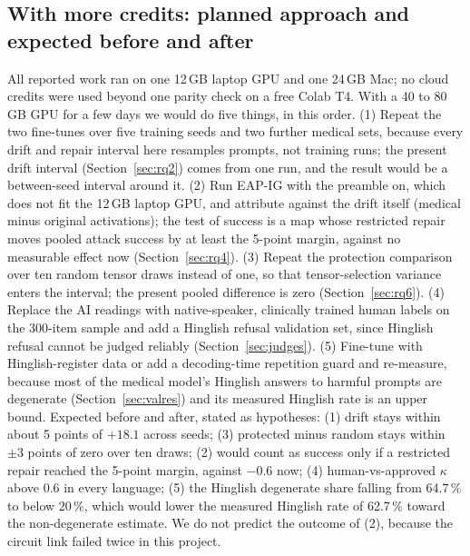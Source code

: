 \subsection{With more credits: planned approach and expected before and after}
All reported work ran on one 12\,GB laptop GPU and one 24\,GB Mac; no cloud credits were used beyond one parity check on a free Colab T4. With a 40 to 80\,GB GPU for a few days we would do five things, in this order. (1) Repeat the two fine-tunes over five training seeds and two further medical sets, because every drift and repair interval here resamples prompts, not training runs; the present drift interval (Section~\ref{sec:rq2}) comes from one run, and the result would be a between-seed interval around it. (2) Run EAP-IG with the preamble on, which does not fit the 12\,GB laptop GPU, and attribute against the drift itself (medical minus original activations); the test of success is a map whose restricted repair moves pooled attack success by at least the 5-point margin, against no measurable effect now (Section~\ref{sec:rq4}). (3) Repeat the protection comparison over ten random tensor draws instead of one, so that tensor-selection variance enters the interval; the present pooled difference is zero (Section~\ref{sec:rq6}). (4) Replace the AI readings with native-speaker, clinically trained human labels on the 300-item sample and add a Hinglish refusal validation set, since Hinglish refusal cannot be judged reliably (Section~\ref{sec:judges}). (5) Fine-tune with Hinglish-register data or add a decoding-time repetition guard and re-measure, because most of the medical model's Hinglish answers to harmful prompts are degenerate (Section~\ref{sec:valres}) and its measured Hinglish rate is an upper bound. Expected before and after, stated as hypotheses: (1) drift stays within about 5 points of $+18.1$ across seeds; (3) protected minus random stays within $\pm 3$ points of zero over ten draws; (2) would count as success only if a restricted repair reached the 5-point margin, against $-0.6$ now; (4) human-vs-approved $\kappa$ above 0.6 in every language; (5) the Hinglish degenerate share falling from 64.7\,\% to below 20\,\%, which would lower the measured Hinglish rate of 62.7\,\% toward the non-degenerate estimate. We do not predict the outcome of (2), because the circuit link failed twice in this project.
